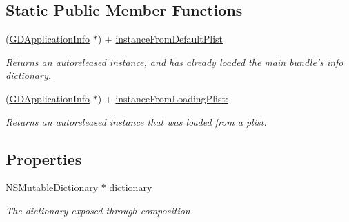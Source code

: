 \subsection*{Static Public Member Functions}
\begin{DoxyCompactItemize}
\item 
\hypertarget{interface_g_d_application_info_afba1d7c0c55aa48a3a1b02a9ddc0423b}{
(\hyperlink{interface_g_d_application_info}{GDApplicationInfo} $\ast$) + \hyperlink{interface_g_d_application_info_afba1d7c0c55aa48a3a1b02a9ddc0423b}{instanceFromDefaultPlist}}
\label{interface_g_d_application_info_afba1d7c0c55aa48a3a1b02a9ddc0423b}

\begin{DoxyCompactList}\small\item\em Returns an autoreleased instance, and has already loaded the main bundle's info dictionary. \item\end{DoxyCompactList}\item 
\hypertarget{interface_g_d_application_info_a45127ada54398199fa7a42290f177414}{
(\hyperlink{interface_g_d_application_info}{GDApplicationInfo} $\ast$) + \hyperlink{interface_g_d_application_info_a45127ada54398199fa7a42290f177414}{instanceFromLoadingPlist:}}
\label{interface_g_d_application_info_a45127ada54398199fa7a42290f177414}

\begin{DoxyCompactList}\small\item\em Returns an autoreleased instance that was loaded from a plist. \item\end{DoxyCompactList}\end{DoxyCompactItemize}
\subsection*{Properties}
\begin{DoxyCompactItemize}
\item 
\hypertarget{interface_g_d_application_info_a6df621702dd9fc8a51e3bb1b2c9bdb2b}{
NSMutableDictionary $\ast$ \hyperlink{interface_g_d_application_info_a6df621702dd9fc8a51e3bb1b2c9bdb2b}{dictionary}}
\label{interface_g_d_application_info_a6df621702dd9fc8a51e3bb1b2c9bdb2b}

\begin{DoxyCompactList}\small\item\em The dictionary exposed through composition. \item\end{DoxyCompactList}\end{DoxyCompactItemize}


